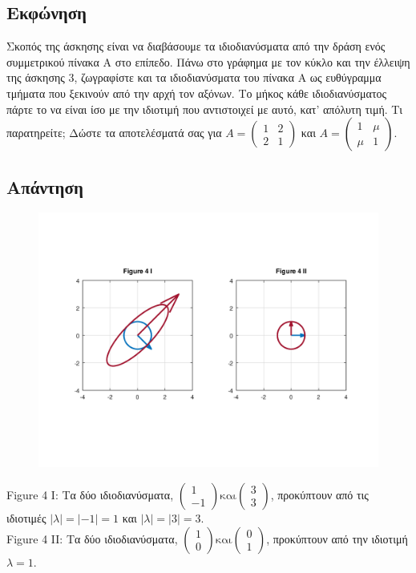 \documentclass[a4paper,12pt]{article}
\begin{document}
\subsection{Εκφώνηση}
Σκοπός της άσκησης είναι να διαβάσουμε τα ιδιοδιανύσματα από την δράση ενός
συμμετρικού πίνακα Α στο επίπεδο. Πάνω στο γράφημα με τον κύκλο και την
έλλειψη της άσκησης 3, ζωγραφίστε και τα ιδιοδιανύσματα του πίνακα Α ως
ευθύγραμμα τμήματα που ξεκινούν από την αρχή τον αξόνων. Το μήκος κάθε
ιδιοδιανύσματος πάρτε το να είναι ίσο με την ιδιοτιμή που αντιστοιχεί με
αυτό, κατ' απόλυτη τιμή. Τι παρατηρείτε; Δώστε
τα αποτελέσματά σας για $
	A=\begin{pmatrix}
		1 & 2 \\
		2 & 1
	\end{pmatrix}
$ και $
	A=\begin{pmatrix}
		1   & \mu \\
		\mu & 1
	\end{pmatrix}
$.
\subsection{Απάντηση}
\begin{center}
	\begin{figure}[H]
		\centering
		\includegraphics[scale=0.7]{4i_ii.png}
	\end{figure}
	Figure 4 I: Τα δύο ιδιοδιανύσματα, $
		\begin{pmatrix}
			1 \\
			-1
		\end{pmatrix} \text{και}
		\begin{pmatrix}
			3 \\
			3
		\end{pmatrix}
	$, προκύπτουν από τις ιδιοτιμές $|λ|=|-1|=1$ και $|λ|=|3|=3$.\\
	Figure 4 II: Τα δύο ιδιοδιανύσματα, $
		\begin{pmatrix}
			1 \\
			0
		\end{pmatrix} \text{και}
		\begin{pmatrix}
			0 \\
			1
		\end{pmatrix}
	$, προκύπτουν από την ιδιοτιμή $λ=1$.
\end{center}
\end{document}
